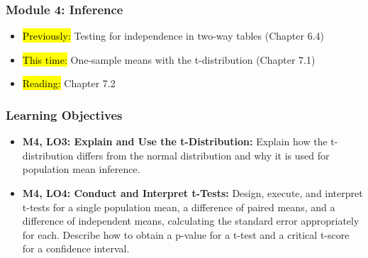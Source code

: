 
\begin{frame}
    \frametitle{Module 4: Inference}
    \begin{itemize}
        \item \hl{Previously: }Testing for independence in two-way tables (Chapter 6.4)
        \item \hl{This time: }One-sample means with the t-distribution (Chapter 7.1)
        \item \hl{Reading: }Chapter 7.2
    \end{itemize}

\end{frame}
\begin{frame}
    \frametitle{Learning Objectives}
    \begin{itemize}
        \item \textbf{M4, LO3: Explain and Use the t-Distribution:} Explain how the t-distribution differs from the normal distribution and why it is used for population mean inference.
        \item \textbf{M4, LO4: Conduct and Interpret t-Tests:} Design, execute, and interpret t-tests for a single population mean, a difference of paired means, and a difference of independent means, calculating the standard error appropriately for each. Describe how to obtain a p-value for a t-test and a critical t-score for a confidence interval.
    \end{itemize}
\end{frame}
